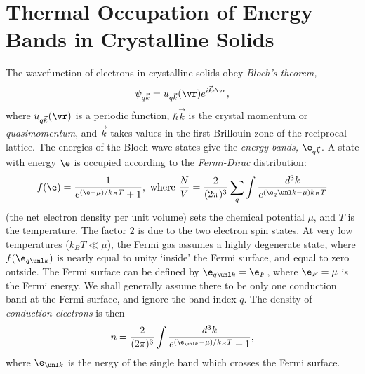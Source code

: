 \documentclass[qo.tex]{subfiles}
\begin{document}
\section{Thermal Occupation of Energy Bands in Crystalline Solids}
The wavefunction of electrons in crystalline solids obey \emph{Bloch's theorem,}
\begin{equation}
    \psi_{q\vec{k}}=u_{q\vec{k}}(\vr)e^{i\vec{k}\cdot\vr},
\end{equation}
where $u_{q\vec{k}}(\vr)$ is a periodic function, $\hbar\vec{k}$ is the crystal momentum or \emph{quasimomentum}, and $\vec{k}$ takes values in the first Brillouin zone of the reciprocal lattice. 
The energies of the Bloch wave states give the \emph{energy bands,} $\e_{q\vec{k}}$.
A state with energy $\e$ is occupied according to the \emph{Fermi-Dirac} distribution:
\begin{equation}
    f(\e) = \frac{1}{e^{(\e-\mu)/k_BT}+1}, \text{ where } \frac NV = \frac{2}{(2\pi)^3}\sum_q\int\frac{d^3k}{e^{(\e_q\vk-\mu)k_BT}}
\end{equation}
(the net electron density per unit volume) sets the chemical potential $\mu$, and $T$ is the temperature.
The factor $2$ is due to the two electron spin states.
At very low temperatures ($k_BT\ll\mu$), the Fermi gas assumes a highly degenerate state, where $f(\e_{q\vk})$ is nearly equal to unity `inside' the Fermi surface, and equal to zero outside. 
The Fermi surface can be defined by $\e_{q\vk}=\e_F$, where $\e_F=\mu$ is the Fermi energy. 
We shall generally assume there to be only one conduction band at the Fermi surface, and ignore the band index $q$.
The density of \emph{conduction electrons} is then
\begin{equation}
    n = \frac{2}{(2\pi)^3}\int \frac{d^3k}{e^{(\e_{\vk}-\mu)/k_BT}+1},
\end{equation}
where $\e_{\vk}$ is the nergy of the single band which crosses the Fermi surface.
\end{document}
